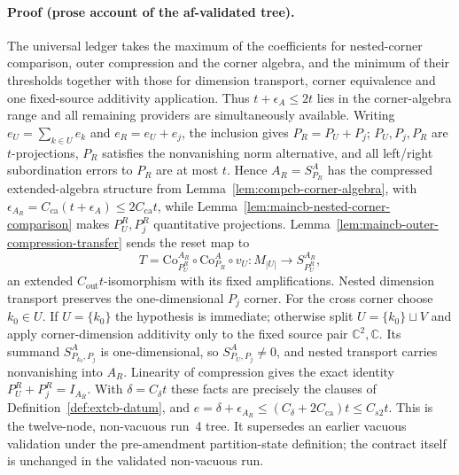 \paragraph{Proof (prose account of the af-validated tree).}
The universal ledger takes the maximum of the coefficients for nested-corner comparison,
outer compression and the corner algebra, and the minimum of their thresholds together
with those for dimension transport, corner equivalence and one fixed-source additivity
application.  Thus $t+\epsilon_A\le2t$ lies in the corner-algebra range and all remaining
providers are simultaneously available.
Writing $e_U=\sum_{k\in U}e_k$ and $e_R=e_U+e_j$, the inclusion gives
$P_R=P_U+P_j$; $P_U,P_j,P_R$ are $t$-projections, $P_R$ satisfies the nonvanishing norm
alternative, and all left/right subordination errors to $P_R$ are at most $t$.  Hence
$A_R=S^A_{P_R}$ has the compressed extended-algebra structure from
Lemma~\ref{lem:compcb-corner-algebra}, with
$\epsilon_{A_R}=C_{\mathrm{ca}}(t+\epsilon_A)\le2C_{\mathrm{ca}}t$, while
Lemma~\ref{lem:maincb-nested-corner-comparison} makes $P_U^R,P_j^R$ quantitative
projections.  Lemma~\ref{lem:maincb-outer-compression-transfer} sends the reset map to
\[
 T=\mathrm{Co}^{A_R}_{P_U^R}\circ\mathrm{Co}^{A}_{P_R}\circ v_U:
 M_{|U|}\longrightarrow S^{A_R}_{P_U^R},
\]
an extended $C_{\mathrm{out}}t$-isomorphism with its fixed amplifications.
Nested dimension transport preserves the one-dimensional $P_j$ corner.  For the cross
corner choose $k_0\in U$.  If $U=\{k_0\}$ the hypothesis is immediate; otherwise split
$U=\{k_0\}\sqcup V$ and apply corner-dimension additivity only to the fixed source pair
$\mathbb C^2,\mathbb C$.  Its summand $S^A_{P_{k_0},P_j}$ is one-dimensional, so
$S^A_{P_U,P_j}\ne0$, and nested transport carries nonvanishing into $A_R$.  Linearity of
compression gives the exact identity $P_U^R+P_j^R=I_{A_R}$.  With
$\delta=C_\delta t$ these facts are precisely the clauses of Definition~\ref{def:extcb-datum},
and $e=\delta+\epsilon_{A_R}\le(C_\delta+2C_{\mathrm{ca}})t\le C_{s2}t$.
This is the twelve-node, non-vacuous run~4 tree.  It supersedes an earlier vacuous
validation under the pre-amendment partition-state definition; the contract itself is
unchanged in the validated non-vacuous run.
